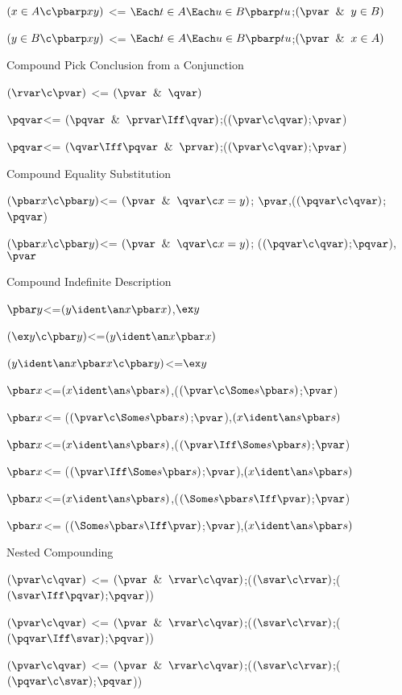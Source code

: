 $(x \in A \c \pbarp xy)$ <= $\Each t \in A \Each u \in B \pbarp tu$;$(\pvar \And y \in B)$

$(y \in B \c \pbarp xy)$ <= $\Each t \in A \Each u \in B \pbarp tu$;$(\pvar \And x \in A)$

\lineb

Compound Pick Conclusion from a Conjunction
\lineb

$(\rvar \c \pvar)$ <=  $(\pvar \And \qvar)$

$\pqvar$<= $(\pqvar \And \prvar \Iff \qvar)$;($(\pvar \c \qvar)$;$\pvar$)

$\pqvar$<= $(\qvar \Iff \pqvar \And \prvar )$;($(\pvar \c \qvar)$;$\pvar$)
\lineb

Compound Equality Substitution
\lineb

$(\pbar x \c \pbar y)$<= $(\pvar \And\qvar\c x = y)$; $\pvar$,($(\pqvar \c\qvar)$;$\pqvar$)

$(\pbar x \c \pbar y)$<= $(\pvar \And\qvar\c x = y)$; ($(\pqvar \c\qvar)$;$\pqvar$),$\pvar$
 
\lineb

Compound Indefinite Description
\lineb

$\pbar y$<=$(y  \ident \an x \pbar x)$,$\ex y$

$(\ex y \c \pbar y)$<=$(y \ident \an x \pbar x)$

$(y \ident \an x \pbar x \c \pbar y)$<=$\ex y$

$\pbar x$<=$(x \ident \an s \pbar s)$,($(\pvar \c \Some s \pbar s)$;$\pvar$)

$\pbar x$<= ($(\pvar \c \Some s \pbar s)$;$\pvar$),$(x \ident \an s \pbar s)$

$\pbar x$<=$(x \ident \an s \pbar s)$,($(\pvar \Iff \Some s \pbar s)$;$\pvar$)

$\pbar x$<= ($(\pvar \Iff \Some s \pbar s)$;$\pvar$),$(x \ident \an s \pbar s)$

$\pbar x$<=$(x \ident \an s \pbar s)$,($(\Some s \pbar s\Iff\pvar)$;$\pvar$)

$\pbar x$<= ($(\Some s \pbar s\Iff \pvar)$;$\pvar$),$(x \ident \an s \pbar s)$
\lineb

Nested Compounding
\lineb

$(\pvar \c \qvar)$ <= $(\pvar \And \rvar \c \qvar)$;($(\svar \c \rvar)$;($(\svar \Iff \pqvar)$;$\pqvar$))

$(\pvar \c \qvar)$ <= $(\pvar \And \rvar \c \qvar)$;($(\svar \c \rvar)$;($(\pqvar \Iff \svar)$;$\pqvar$))

$(\pvar \c \qvar)$ <= $(\pvar \And \rvar \c \qvar)$;($(\svar \c \rvar)$;($(\pqvar \c \svar)$;$\pqvar$))

